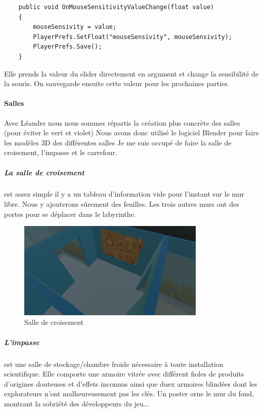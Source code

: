 \documentclass{article}
\begin{document}
\par\vspace{0.2cm}
\begin{lstlisting}
    public void OnMouseSensitivityValueChange(float value)
    {
        mouseSensivity = value;
        PlayerPrefs.SetFloat("mouseSensivity", mouseSensivity);
        PlayerPrefs.Save();
    }
\end{lstlisting}

Elle prends la valeur du slider directement en argument et change la sensibilité de la souris. On sauvegarde ensuite cette valeur pour les prochaines parties.

\paragraph{Salles}
Avec Léandre nous nous sommes répartis la création plus concrète des salles (pour éviter le vert et violet) Nous avons donc utilisé le logiciel Blender pour faire les modèles 3D des différentes salles
Je me suis occupé de faire la salle de croisement, l'impasse et le carrefour.

\subparagraph{La salle de croisement}\hspace{-0.2cm}est assez simple il y a un tableau d'information vide pour l'instant sur le mur libre. Nous y ajouterons sûrement des feuilles. Les trois autres murs ont des portes pour se déplacer dans le labyrinthe.

\begin{figure}[!h]
    \centering
    \includegraphics[width=0.8\textwidth]{salle_croisement.png}
    \caption{Salle de croisement}
    \label{salle de croisement}
\end{figure}

\subparagraph{L'impasse}\hspace{-0.2cm}est une salle de stockage/chambre froide nécessaire à toute installation scientifique. Elle comporte une armoire vitrée avec différent fioles de produits d'origines douteuses et d'effets inconnus ainsi que duex armoires blindées dont les explorateurs n'ont malheureusement pas les clés. Un poster orne le mur du fond, montrant la sobriété des développeurs du jeu...
\end{document}
